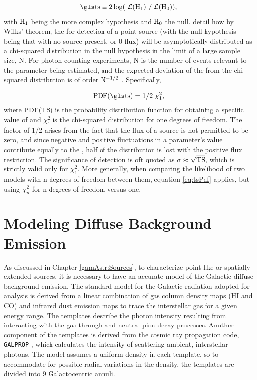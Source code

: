 \begin{equation}\label{eq:LRT}
\rm \ts{} \equiv 2\log(\like{}(H_1)~/ \like{}(H_0)),
\end{equation}
with ${\rm H_1}$ being the more complex hypothesis and ${\rm H_0}$ the null. \cite{mattox96} detail how by Wilks' theorem, the \ts{} for detection of a point source (with the null hypothesis being that with no source present, or 0 flux) will be asymptotically distributed as a chi-squared distribution in the null hypothesis in the limit of a large sample size, N. For photon counting experiments, N is the number of events relevant to the parameter being estimated, and the expected deviation of the \ts{} from the chi-squared distribution is of order ${\rm N^{-1/2}}$ \cite{Cash79}. Specifically,


\begin{equation}\label{eq:tsPdf}
\rm PDF(\ts{}) = 1/2~\chi^2_1,
\end{equation} 
where PDF(TS) is the probability distribution function for obtaining a specific value of \ts{} and $\chi^2_1$ is the chi-squared  distribution for one degrees of freedom.   The factor of 1/2 arises from the fact that the flux of a source is not permitted to be zero, and since negative and positive fluctuations in a parameter's value contribute equally to the \ts{}, half of the distribution is lost with the positive flux restriction. The significance of detection is oft quoted as ${\rm \sigma \approx \sqrt{TS}}$, which is strictly valid only for $\chi^2_1$. More generally, when comparing the likelihood of two models with n degrees of freedom between them, equation \ref{eq:tsPdf} applies, but using  $\chi^2_n$ for n degrees of freedom versus one.

\section{\label{FGST:bkg}Modeling Diffuse Background Emission}
As discussed in Chapter \ref{gamAstr:Sources}, to characterize point-like or spatially extended  \lat{} sources, it is necessary to have an accurate model of the Galactic diffuse background emission. The standard model for the Galactic radiation adopted for \lat{} analysis \citep{diffuse16} is derived from a linear combination of gas column density maps (HI and CO) and infrared dust emission maps to trace the interstellar gas for a given \gam{} energy range. The templates describe the \gam{} photon intensity resulting from \crs{} interacting with the gas through \brems{} and neutral pion decay processes. Another component of the templates is derived from the cosmic ray propagation code, {\tt GALPROP} \citep{strong98,strong07}, which calculates the \gam{} intensity of \crs{} \ic{} scattering ambient, interstellar photons. The model assumes a uniform \cray{} density in each template, so to accommodate for possible radial variations in the \cray{} density, the templates are divided into 9 Galactocentric annuli. 

